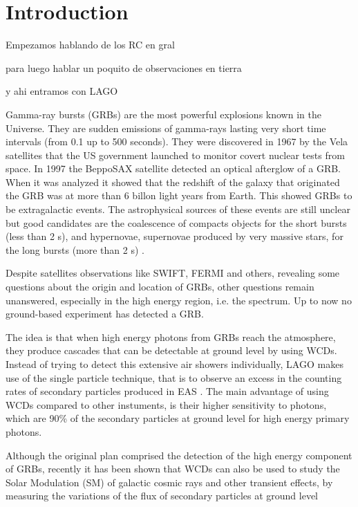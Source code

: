 \section{Introduction}\label{sec:intro}

Empezamos hablando de los RC en gral

para luego hablar un poquito de observaciones en tierra

y ahi entramos con LAGO


Gamma-ray bursts (GRBs) are the most powerful explosions known in the Universe.
They are sudden emissions of gamma-rays lasting very short time intervals (from
0.1 up to 500 seconds). They were discovered in 1967 by the Vela satellites
that the US government launched to monitor covert nuclear tests from space. In
1997 the BeppoSAX satellite detected an optical afterglow of a GRB.  When it
was analyzed it showed that the redshift of the galaxy that originated the GRB
was at more than 6 billon light years from Earth. This showed GRBs to be
extragalactic events. The astrophysical sources of these events are still
unclear but good candidates are the coalescence of compacts objects for the
short bursts (less than 2 s), and hypernovae, supernovae produced by very
massive stars, for the long bursts (more than 2 s) \cite{Meszaros2006}.

Despite satellites observations like SWIFT, FERMI and others, revealing
some questions about the origin and location of GRBs, other questions remain
unanswered, especially in the high energy region, i.e. the spectrum. Up to now
no ground-based experiment has detected a GRB.

The idea is that when high energy photons from GRBs reach the atmosphere, they
produce cascades that can be detectable at ground level by using WCDs. Instead
of trying to detect this extensive air showers individually, LAGO makes use of the single
particle technique, that is to observe an excess in the counting rates of
secondary particles produced in EAS \cite{Vernetto2000}. The main advantage of
using WCDs compared to other instuments, is their higher sensitivity to
photons, which are 90\% of the secondary particles at ground level for high
energy primary photons.

Although the original plan comprised the detection of the high energy component
of GRBs, recently it has been shown that WCDs can also be used to study the
Solar Modulation (SM) of galactic cosmic rays and other transient effects, by
measuring the variations of the flux of secondary particles at ground level
\cite{PierreAugerCollaboration2011}

